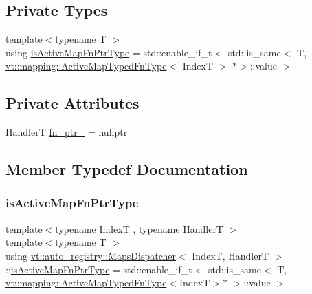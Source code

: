 \subsection*{Private Types}
\begin{DoxyCompactItemize}
\item 
{\footnotesize template$<$typename T $>$ }\\using \hyperlink{structvt_1_1auto__registry_1_1_maps_dispatcher_a24cb754617b982102f2d0e9ff7ddb021}{is\+Active\+Map\+Fn\+Ptr\+Type} = std\+::enable\+\_\+if\+\_\+t$<$ std\+::is\+\_\+same$<$ T, \hyperlink{namespacevt_1_1mapping_ad7c0812428b339edd904a865e0080ecd}{vt\+::mapping\+::\+Active\+Map\+Typed\+Fn\+Type}$<$ IndexT $>$ $\ast$$>$\+::value $>$
\end{DoxyCompactItemize}
\subsection*{Private Attributes}
\begin{DoxyCompactItemize}
\item 
HandlerT \hyperlink{structvt_1_1auto__registry_1_1_maps_dispatcher_a6538f72c68342ee7bad7a3b7a60a6aed}{fn\+\_\+ptr\+\_\+} = nullptr
\end{DoxyCompactItemize}


\subsection{Member Typedef Documentation}
\mbox{\label{structvt_1_1auto__registry_1_1_maps_dispatcher_a24cb754617b982102f2d0e9ff7ddb021}} 
\subsubsection{\texorpdfstring{is\+Active\+Map\+Fn\+Ptr\+Type}{isActiveMapFnPtrType}}
{\footnotesize\ttfamily template$<$typename IndexT , typename HandlerT $>$ \\
template$<$typename T $>$ \\
using \hyperlink{structvt_1_1auto__registry_1_1_maps_dispatcher}{vt\+::auto\+\_\+registry\+::\+Maps\+Dispatcher}$<$ IndexT, HandlerT $>$\+::\hyperlink{structvt_1_1auto__registry_1_1_maps_dispatcher_a24cb754617b982102f2d0e9ff7ddb021}{is\+Active\+Map\+Fn\+Ptr\+Type} =  std\+::enable\+\_\+if\+\_\+t$<$ std\+::is\+\_\+same$<$ T, \hyperlink{namespacevt_1_1mapping_ad7c0812428b339edd904a865e0080ecd}{vt\+::mapping\+::\+Active\+Map\+Typed\+Fn\+Type}$<$IndexT$>$$\ast$ $>$\+::value $>$\hspace{0.3cm}{\ttfamily [private]}}



